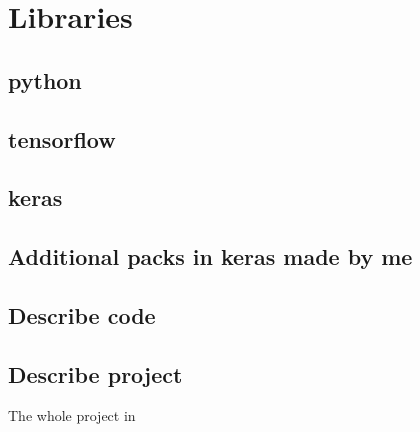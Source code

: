 
    
\section{Libraries}
    \subsection{python}
    \subsection{tensorflow}
    \subsection{keras}
    
    \subsection{Additional packs in keras made by me}
    
    \subsection{Describe code}
    
    \subsection{Describe project}
    
    The whole project in 
